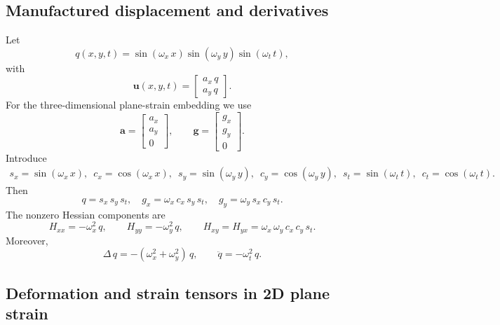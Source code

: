 \documentclass[11pt,a4paper]{article}
\begin{document}
\subsection{Manufactured displacement and derivatives}

Let
%
\begin{equation}
q(x,y,t)=\sin(\omega_x\,x)\sin(\omega_y\,y)\sin(\omega_t\,t),
\end{equation}
%
with
%
\begin{equation}
\boxed{
\textbf{u}(x,y,t)=
\begin{bmatrix}a_x\,q\\a_y\,q\end{bmatrix}
}.                
\label{eq_u2D}    
\end{equation}
%
For the three-dimensional plane-strain embedding we use
%
\begin{equation}
\textbf{a}=\begin{bmatrix}a_x\\a_y\\0\end{bmatrix},
\qquad
\textbf{g}=\begin{bmatrix}g_x\\g_y\\0\end{bmatrix}.
\end{equation}
%
Introduce
%
\begin{eqnarray}
s_x=\sin(\omega_x\,x),\,\,\, c_x=\cos(\omega_x\,x),\,\,\,
s_y=\sin(\omega_y\,y),\,\,\, c_y=\cos(\omega_y\,y),\,\,\,s_t=\sin(\omega_t\,t),\,\,\, c_t=\cos(\omega_t\,t).
\end{eqnarray}
%
Then
%
\begin{equation}
\boxed{
q=s_x\,s_y\,s_t,
\quad
g_x=\omega_x\,c_x\,s_y\,s_t,
\quad
g_y=\omega_y\,s_x\,c_y\,s_t
}.
\end{equation}
%
The nonzero Hessian components are
%
\begin{equation}
\boxed{
H_{xx}=-\omega_x^2\,q,
\qquad
H_{yy}=-\omega_y^2\,q,
\qquad
H_{xy}=H_{yx}=\omega_x\,\omega_y\,c_x\,c_y\,s_t
}.
\end{equation}
%
Moreover,
%
\begin{equation}
\boxed{
\Delta\, q=-(\omega_x^2+\omega_y^2)\,q,
\qquad
\ddot q=-\omega_t^2\,q
}.
\label{eq_qDeriv2D}
\end{equation}

\subsection{Deformation and strain tensors in 2D plane strain}
\end{document}
